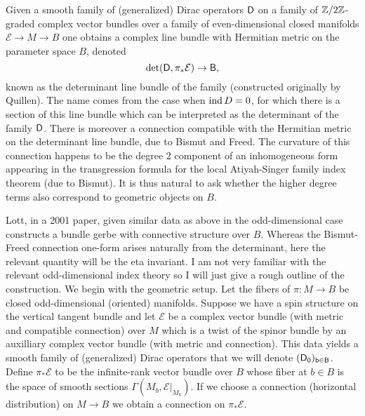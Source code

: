 \documentclass{amsart}
\begin{document}
\begin{example}
    Given a smooth family of (generalized) Dirac operators $\sf D$ on a family of $\mathbb{Z}/2\mathbb{Z}$-graded
    complex vector bundles
    over a family of even-dimensional closed manifolds $\mathcal{E}\to M\to B$ one obtains a complex
    line bundle with Hermitian metric on the parameter space $B$, denoted
    \begin{equation*}
        \det(\sf D, \pi_*\mathcal{E}) \to B,
    \end{equation*}
    known as the determinant line bundle of the family (constructed originally by Quillen).
    The name comes from the case when $\operatorname{ind} D=0$, for which there is a section of this line
    bundle which can be interpreted as the determinant of the family $\sf D$. There is
    moreover a connection compatible with the Hermitian metric on the determinant line bundle,
    due to Bismut and Freed. The curvature of this connection happens to be the degree
    2 component of an inhomogeneous form appearing in the transgression formula for the
    local Atiyah-Singer family index theorem (due to Bismut).
    It is thus natural to ask whether the higher degree terms also correspond to geometric
    objects on $B$.

    Lott, in a 2001 paper, given similar data as above in the odd-dimensional case
    constructs a bundle gerbe with connective structure over $B$. Whereas the Bismut-Freed
    connection one-form arises naturally from the determinant, here the relevant
    quantity will be the eta invariant.
    I am not very familiar
    with the relevant odd-dimensional index theory so I will just give a rough outline
    of the construction. We begin with the geometric setup.
    Let the fibers of $\pi:M\to B$ be closed odd-dimensional (oriented) manifolds.
    Suppose we have a spin structure on the vertical tangent bundle and let $\mathcal{E}$
    be a complex vector bundle (with metric and compatible connection) over $M$ which is 
    a twist of the spinor bundle by an auxilliary complex vector bundle (with metric and
    connection). This data yields a smooth family of (generalized) Dirac operators that
    we will denote $(\sf D_0)_{b \in B}$. 
    Define $\pi_*\mathcal{E}$ to be the infinite-rank vector bundle over $B$ whose fiber
    at $b\in B$ is the space of smooth sections $\Gamma(M_b, \mathcal{E}|_{M_b})$.
    If we choose a connection (horizontal distribution) on $M\to B$ we obtain a
    connection on $\pi_*\mathcal{E}$.


\end{example}
\end{document}
